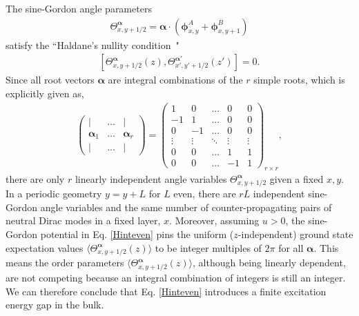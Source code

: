 The sine-Gordon angle parameters \begin{align}\Theta^{\boldsymbol\alpha}_{x,y+1/2}=\boldsymbol\alpha\cdot(\boldsymbol\phi^A_{x,y}+\boldsymbol\phi^B_{x,y+1})\end{align} satisfy the ``Haldane's nullity condition~\cite{PhysRevLett.74.2090}" \begin{align}
\left[\Theta^{\boldsymbol\alpha}_{x,y+1/2}(z),\Theta^{\boldsymbol\alpha'}_{x',y'+1/2}(z')\right]=0.
\label{Haldanenulity}
\end{align} Since all root vectors $\boldsymbol\alpha$ are integral combinations of the $r$ simple roots, which is explicitly given as, \begin{align}\begin{pmatrix}|&\ldots&|\\\boldsymbol\alpha_1&\ldots&\boldsymbol\alpha_r\\|&\ldots&|\end{pmatrix}=\begin{pmatrix}1&0&\ldots&0&0\\-1&1&\ldots&0&0\\0&-1&\ldots&0&0\\\vdots&\vdots&\ddots&\vdots&\vdots\\0&0&\ldots&1&1\\0&0&\ldots&-1&1\end{pmatrix}_{r\times r},\end{align} there are only $r$ linearly independent angle variables $\Theta^{\boldsymbol\alpha}_{x,y+1/2}$ given a fixed $x,y$. In a periodic geometry $y=y+L$ for $L$ even, there are $rL$ independent sine-Gordon angle variables and the same number of counter-propagating pairs of neutral Dirac modes in a fixed layer, $x$. Moreover, assuming $u>0$, the sine-Gordon potential in Eq. \eqref{Hinteven} pins the uniform ($z$-independent) ground state expectation values $\langle\Theta^{\boldsymbol\alpha}_{x,y+1/2}(z)\rangle$ to be integer multiples of $2\pi$ for all $\boldsymbol\alpha$. This means the order parameters $\langle\Theta^{\boldsymbol\alpha}_{x,y+1/2}(z)\rangle$, although being linearly dependent, are not competing because an integral combination of integers is still an integer. We can therefore conclude that Eq. \eqref{Hinteven} introduces a finite excitation energy gap in the bulk.

